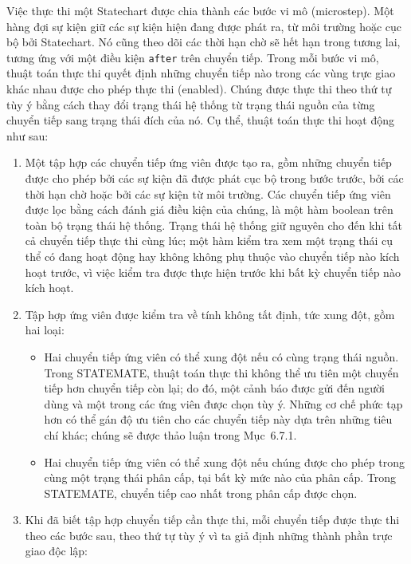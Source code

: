 Việc thực thi một Statechart được chia thành các bước vi mô (microstep). Một hàng đợi sự kiện giữ các sự kiện hiện đang được phát ra, từ môi trường hoặc cục bộ bởi Statechart. Nó cũng theo dõi các thời hạn chờ sẽ hết hạn trong tương lai, tương ứng với một điều kiện \texttt{after} trên chuyển tiếp. Trong mỗi bước vi mô, thuật toán thực thi quyết định những chuyển tiếp nào trong các vùng trực giao khác nhau được cho phép thực thi (enabled). Chúng được thực thi theo thứ tự tùy ý bằng cách thay đổi trạng thái hệ thống từ trạng thái nguồn của từng chuyển tiếp sang trạng thái đích của nó. Cụ thể, thuật toán thực thi hoạt động như sau:
\begin{enumerate}
\item Một tập hợp các chuyển tiếp ứng viên được tạo ra, gồm những chuyển tiếp được cho phép bởi các sự kiện đã được phát cục bộ trong bước trước, bởi các thời hạn chờ hoặc bởi các sự kiện từ môi trường. Các chuyển tiếp ứng viên được lọc bằng cách
đánh giá điều kiện của chúng, là một hàm boolean trên toàn bộ trạng thái hệ thống. Trạng thái hệ thống giữ nguyên cho đến khi tất cả chuyển tiếp thực thi cùng lúc; một hàm kiểm tra xem một trạng thái cụ thể có đang hoạt động hay không không phụ thuộc vào chuyển tiếp nào kích hoạt trước, vì việc kiểm tra được thực hiện trước khi bất kỳ chuyển tiếp nào kích hoạt.
\item Tập hợp ứng viên được kiểm tra về tính không tất định, tức xung đột, gồm hai loại:
\begin{itemize}
\item Hai chuyển tiếp ứng viên có thể xung đột nếu có cùng trạng thái nguồn. Trong STATEMATE, thuật toán thực thi không thể ưu tiên một chuyển tiếp hơn chuyển tiếp còn lại; do đó, một cảnh báo được gửi đến người dùng và một trong các ứng viên được chọn tùy ý. Những cơ chế phức tạp hơn có thể gán độ ưu tiên cho các chuyển tiếp này dựa trên những tiêu chí khác; chúng sẽ được thảo luận trong Mục~6.7.1.
\item Hai chuyển tiếp ứng viên có thể xung đột nếu chúng được cho phép trong cùng một trạng thái phân cấp, tại bất kỳ mức nào của phân cấp. Trong STATEMATE, chuyển tiếp cao nhất trong phân cấp được chọn.
\end{itemize}
\item Khi đã biết tập hợp chuyển tiếp cần thực thi, mỗi chuyển tiếp được thực thi theo các bước sau, theo thứ tự tùy ý vì ta giả định những thành phần trực giao độc lập:
\begin{enumerate}
\renewcommand{\labelenumii}{\alph{enumii}.}

\end{enumerate}
\end{enumerate}
